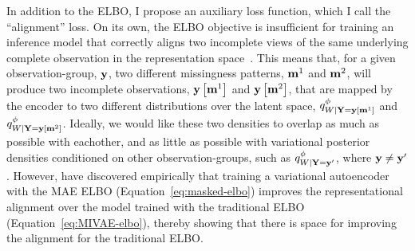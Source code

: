\documentclass[../thesis.tex]{subfiles}
\begin{document}
In addition to the ELBO, I propose an auxiliary loss function, which I call the ``alignment'' loss. On its own, the ELBO objective is insufficient for training an inference model that correctly aligns two incomplete views of the same underlying complete observation in the representation space~\citep{heMaskedAutoencodersAre2022,zhangHowMaskMatters2022}. This means that, for a given observation-group, $\mathbf{{y}}$, two different missingness patterns, $\mathbf{{m}}^1$ and $\mathbf{{m}}^2$, will produce two incomplete observations, $\mathbf{{y}} \left[ \mathbf{{m}}^1 \right]$ and $\mathbf{{y}} \left[ \mathbf{{m}}^2 \right]$, that are mapped by the encoder to two different distributions over the latent space, $\myfunc{q}^{\phi}_{\myrv{w} | \mygroup{\myrv{y}} = \mygroup{\myvect{y}} \left[ \mygroup{\myvect{m}}^1 \right]}$ and $\myfunc{q}^{\phi}_{\myrv{w} | \mygroup{\myrv{y}} = \mygroup{\myvect{y}} \left[ \mygroup{\myvect{m}}^2 \right]}$. Ideally, we would like these two densities to overlap as much as possible with eachother, and as little as possible with variational posterior densities conditioned on other observation-groups, such as $\myfunc{q}^{\phi}_{\myrv{w} | \mygroup{\myrv{y}} = \mygroup{\myvect{y}}'}$, where $\mathbf{{y}} \neq \mathbf{{y}}'$. However, \citet{zhangHowMaskMatters2022} have discovered empirically that training a variational autoencoder with the MAE ELBO (Equation~\ref{eq:masked-elbo}) improves the representational alignment over the model trained with the traditional ELBO (Equation~\ref{eq:MIVAE-elbo}), thereby showing that there is space for improving the alignment for the traditional ELBO.
\end{document}
